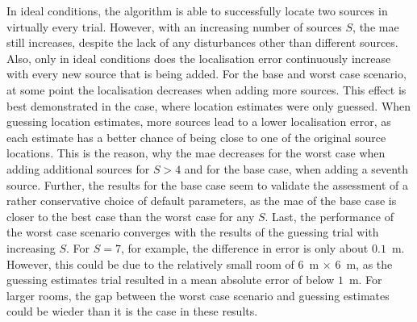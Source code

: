 In ideal conditions, the algorithm is able to successfully locate two sources in virtually every trial. However, with an increasing number of sources $S$, the \gls{mae} still increases, despite the lack of any disturbances other than different sources. Also, only in ideal conditions does the localisation error continuously increase with every new source that is being added. For the base and worst case scenario, at some point the localisation decreases when adding more sources. This effect is best demonstrated in the case, where location estimates were only guessed. When guessing location estimates, more sources lead to a lower localisation error, as each estimate has a better chance of being close to one of the original source locations. This is the reason, why the \gls{mae} decreases for the worst case when adding additional sources for $S>4$ and for the base case, when adding a seventh source. Further, the results for the base case seem to validate the assessment of a rather conservative choice of default parameters, as the \gls{mae} of the base case is closer to the best case than the worst case for any $S$. Last, the performance of the worst case scenario converges with the results of the guessing trial with increasing $S$. For $S=7$, for example, the difference in error is only about $0.1$~m. However, this could be due to the relatively small room of 6~m $\times$ 6~m, as the guessing estimates trial resulted in a mean absolute error of below $1$~m. For larger rooms, the gap between the worst case scenario and guessing estimates could be wieder than it is the case in these results.